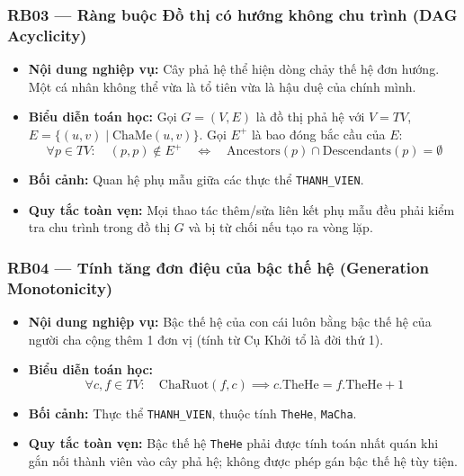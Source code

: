 \subsubsection{RB03 --- Ràng buộc Đồ thị có hướng không chu trình (DAG Acyclicity)}
\begin{itemize}
    \item \textbf{Nội dung nghiệp vụ:} Cây phả hệ thể hiện dòng chảy thế hệ đơn hướng. Một cá nhân không thể vừa là tổ tiên vừa là hậu duệ của chính mình.
    \item \textbf{Biểu diễn toán học:} Gọi $G = (V, E)$ là đồ thị phả hệ với $V = TV$, $E = \{(u,v) \mid \text{ChaMe}(u,v)\}$. Gọi $E^{+}$ là bao đóng bắc cầu của $E$:
    \begin{equation}
        \forall p \in TV: \quad
        (p, p) \notin E^{+}
        \quad\iff\quad
        \text{Ancestors}(p) \cap \text{Descendants}(p) = \emptyset
    \end{equation}
    \item \textbf{Bối cảnh:} Quan hệ phụ mẫu giữa các thực thể \texttt{THANH\_VIEN}.
    \item \textbf{Quy tắc toàn vẹn:} Mọi thao tác thêm/sửa liên kết phụ mẫu đều phải kiểm tra chu trình trong đồ thị $G$ và bị từ chối nếu tạo ra vòng lặp.
\end{itemize}

\subsubsection{RB04 --- Tính tăng đơn điệu của bậc thế hệ (Generation Monotonicity)}
\begin{itemize}
    \item \textbf{Nội dung nghiệp vụ:} Bậc thế hệ của con cái luôn bằng bậc thế hệ của người cha cộng thêm 1 đơn vị (tính từ Cụ Khởi tổ là đời thứ 1).
    \item \textbf{Biểu diễn toán học:}
    \begin{equation}
        \forall c, f \in TV: \quad
        \text{ChaRuot}(f, c) \implies c.\text{TheHe} = f.\text{TheHe} + 1
    \end{equation}
    \item \textbf{Bối cảnh:} Thực thể \texttt{THANH\_VIEN}, thuộc tính \texttt{TheHe}, \texttt{MaCha}.
    \item \textbf{Quy tắc toàn vẹn:} Bậc thế hệ \texttt{TheHe} phải được tính toán nhất quán khi gắn nối thành viên vào cây phả hệ; không được phép gán bậc thế hệ tùy tiện.
\end{itemize}

